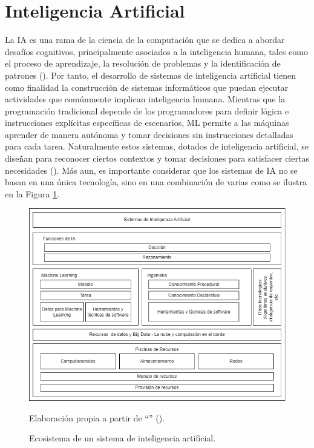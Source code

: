 \section{Inteligencia Artificial}
La IA es una rama de la ciencia de la computación que se dedica a abordar desafíos cognitivos, principalmente asociados a la inteligencia humana, tales como el proceso de aprendizaje, la resolución de problemas y la identificación de patrones (\cite{kim2019implementation}). Por tanto, el desarrollo de sistemas de inteligencia artificial tienen como finalidad la construcción de sistemas informáticos que puedan ejecutar actividades que comúnmente implican inteligencia humana. Mientras que la programación tradicional depende de los programadores para definir lógica e instrucciones explícitas específicas de escenarios, ML permite a las máquinas aprender de manera autónoma y tomar decisiones sin instrucciones detalladas para cada tarea. Naturalmente estos sistemas, dotados de inteligencia artificial, se diseñan para reconocer ciertos contextos y tomar decisiones para satisfacer ciertas necesidades (\cite{iso22989}).  Más aun, es importante considerar que los sistemas de IA no se basan en una única tecnología, sino en una combinación de varias como se ilustra en la Figura \ref{figs:ai_ecosystem}.
\begin{figure}[htb]
	\centering
	\includegraphics[width=1.0\textwidth]{images/marcoteorico/ai_ecosystem.png}
	\caption{Ecosistema de un sistema de inteligencia artificial.}
    \vspace{-0.2cm}
	\footnotesize{{Elaboración propia a partir de ``\textit{}'' (\citeyear{iso22989}).}}
	\label{figs:ai_ecosystem} 
\end{figure}

